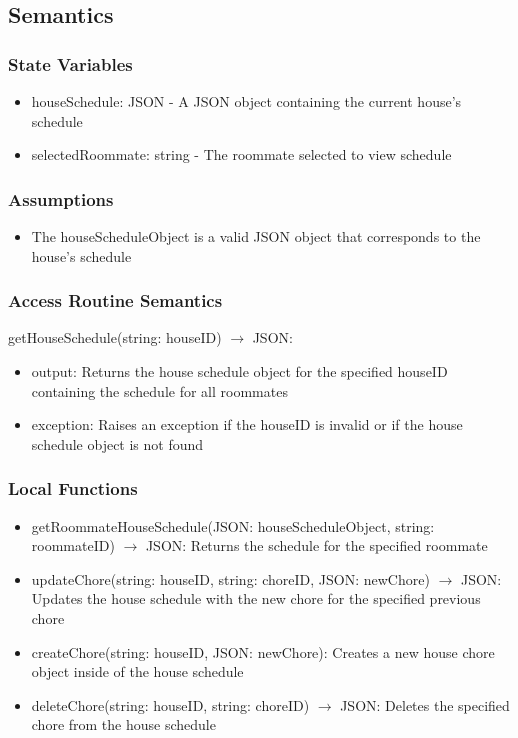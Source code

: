 \documentclass[12pt, titlepage]{article}
\begin{document}
\subsection{Semantics}

\subsubsection{State Variables}

\begin{itemize}
  \item houseSchedule: JSON - A JSON object containing the current house's schedule
  \item selectedRoommate: string - The roommate selected to view schedule
\end{itemize}


\subsubsection{Assumptions}

\begin{itemize}
  \item The houseScheduleObject is a valid JSON object that corresponds to the house's schedule
\end{itemize}

\subsubsection{Access Routine Semantics}

\noindent getHouseSchedule(string: houseID) $\rightarrow$ JSON:
\begin{itemize}
\item output: Returns the house schedule object for the specified houseID containing the schedule for all roommates
\item exception: Raises an exception if the houseID is invalid or if the house schedule object is not found
\end{itemize}


\subsubsection{Local Functions}

\begin{itemize}
  \item getRoommateHouseSchedule(JSON: houseScheduleObject, string: roommateID) $\rightarrow$ JSON: Returns the schedule for the specified roommate
  \item updateChore(string: houseID, string: choreID, JSON: newChore) $\rightarrow$ JSON: Updates the house schedule with the new chore for the specified previous chore
  \item createChore(string: houseID, JSON: newChore): Creates a new house chore object inside of the house schedule
  \item deleteChore(string: houseID, string: choreID) $\rightarrow$ JSON: Deletes the specified chore from the house schedule

\end{itemize}
\end{document}
